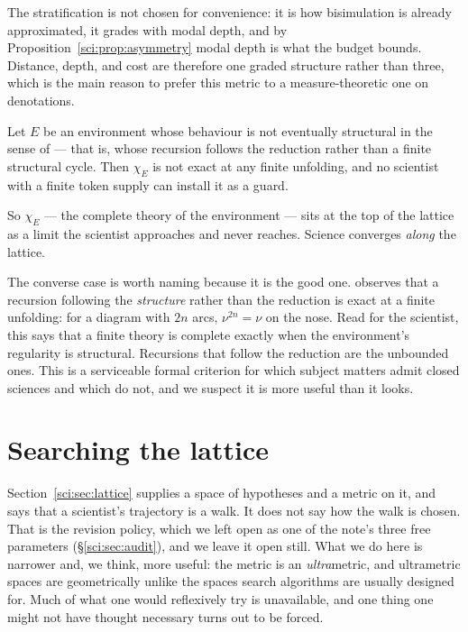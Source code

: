 The stratification is not chosen for convenience: it is how bisimulation is already approximated, it
grades with modal depth, and by Proposition~\ref{sci:prop:asymmetry} modal depth is what the budget
bounds. Distance, depth, and cost are therefore one graded structure rather than three, which is the
main reason to prefer this metric to a measure-theoretic one on denotations.

\begin{proposition}
\label{sci:prop:limit}
Let $E$ be an environment whose behaviour is not eventually structural in the sense of
\cite[Rem.~6]{ClassifierNote} --- that is, whose recursion follows the reduction rather than a finite
structural cycle. Then $\chi_E$ is not exact at any finite unfolding, and no scientist with a finite
token supply can install it as a guard.
\end{proposition}

So $\chi_E$ --- the complete theory of the environment --- sits at the top of the lattice as a limit
the scientist approaches and never reaches. Science converges \emph{along} the lattice.

\begin{remark}
\label{sci:rem:structural}
The converse case is worth naming because it is the good one. \cite[Rem.~6]{ClassifierNote} observes
that a recursion following the \emph{structure} rather than the reduction is exact at a finite
unfolding: for a diagram with $2n$ arcs, $\nu^{2n} = \nu$ on the nose. Read for the scientist, this
says that a finite theory is complete exactly when the environment's regularity is structural.
Recursions that follow the reduction are the unbounded ones. This is a serviceable formal criterion
for which subject matters admit closed sciences and which do not, and we suspect it is more useful
than it looks.
\end{remark}

\section{Searching the lattice}\label{sci:S6}
\label{sci:sec:search}

Section~\ref{sci:sec:lattice} supplies a space of hypotheses and a metric on it, and says that a scientist's
trajectory is a walk. It does not say how the walk is chosen. That is the revision policy, which we
left open as one of the note's three free parameters (\S\ref{sci:sec:audit}), and we leave it open still.
What we do here is narrower and, we think, more useful: the metric is an \emph{ultra}metric, and
ultrametric spaces are geometrically unlike the spaces search algorithms are usually designed for. Much
of what one would reflexively try is unavailable, and one thing one might not have thought necessary
turns out to be forced.

